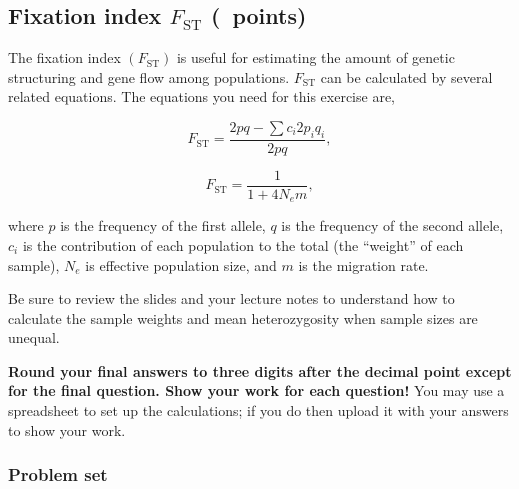 \documentclass[12pt, addpoints, hidelinks]{exam}
\newcommand{\fst}{$F_{\mathrm{ST}}$}
\begin{document}

\subsection*{Fixation index \fst{} (\numpoints\ points)}

The fixation index $(F_\mathrm{ST})$ is useful for estimating the amount of genetic structuring and gene flow among populations. \fst{} can be calculated by several related equations. The equations you need for this exercise are,
\begin{multicols}{2}
\noindent	
\begin{equation}
F_\mathrm{ST} = \dfrac{2pq-\sum c_i2p_iq_i}{2pq},
\end{equation}

	
	\columnbreak
	
\noindent	
\begin{equation}
F_\mathrm{ST} = \dfrac{1}{1+4N_em},
\end{equation}%
\end{multicols}

where $p$ is the frequency of the first allele, $q$ is the frequency of the second allele, $c_i$ is the contribution of each population to the total (the “weight” of each sample), $N_e$ is effective population size, and $m$ is the migration rate.

Be sure to review the slides and your lecture notes to understand how to calculate the sample weights and mean heterozygosity when sample sizes are unequal.

\textbf{Round your final answers to three digits after the decimal point except for the final question. Show your work for each question!} You may use a spreadsheet to set up the calculations; if you do then upload it with your answers to show your work.

\subsubsection*{Problem set}
\end{document}
